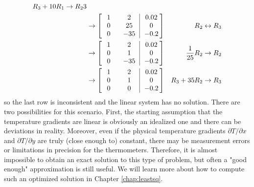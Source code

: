 \begin{solution}
\begin{align*}
\begin{aligned}
R_3 + 10R_1 \to R_23\\
\end{aligned} \\
&\to 
\left[\begin{array}{@{}wc{20pt}wc{20pt}|wc{24pt}@{}}   
1 & 2 & 0.02 \\
0 & 25 & 0 \\
0 & -35 & -0.2 
\end{array}\right]
& R_2 \leftrightarrow R_3 \\
&\to 
\left[\begin{array}{@{}wc{20pt}wc{20pt}|wc{24pt}@{}}   
1 & 2 & 0.02 \\
0 & 1 & 0 \\
0 & -35 & -0.2 
\end{array}\right]
& \frac{1}{25}R_2 \to R_2 \\
&\to 
\left[\begin{array}{@{}wc{20pt}wc{20pt}|wc{24pt}@{}}   
1 & 2 & 0.02 \\
0 & 1 & 0 \\
0 & 0 & -0.2 
\end{array}\right]
& R_3 + 35R_2 \to R_3 
\end{align*}
so the last row is inconsistent and the linear system has no solution. There are two possibilities for this scenario. First, the starting assumption that the temperature gradients are linear is obviously an idealized one and there can be deviations in reality. Moreover, even if the physical temperature gradients $\partial T/\partial x$ and $\partial T/\partial y$ are truly (close enough to) constant, there may be measurement errors or limitations in precision for the thermometers. Therefore, it is almost impossible to obtain an exact solution to this type of problem, but often a "good enough" approximation is still useful. We will learn more about how to compute such an optimized solution in Chapter \ref{chap:leastsq}.
\end{solution}

